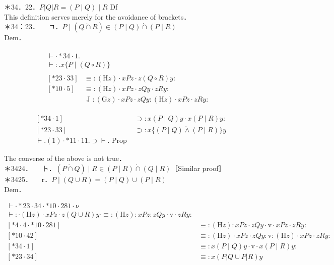 \documentclass[10pt]{article}
\begin{document}
＊34．22．$P|Q| R=(P \mid Q) \mid R$ Df\\
This definition serves merely for the avoidance of brackets．\\
＊34：23．$\quad$ ㄱ．$P \mid(Q \dot{\cap} R) \in(P \mid Q) \dot{\cap}(P \mid R)$\\
Dem．

$$
\begin{array}{ll}
\begin{array}{l}
\vdash \cdot * 34 \cdot 1 . \\
\vdash: . x\{P \mid(Q \circ R)\}
\end{array} & \\
\begin{array}{ll}
{[* 23 \cdot 33]} & \equiv:(\mathrm{H} z) \cdot x P z \cdot z(Q \circ R) y: \\
{[* 10 \cdot 5]} & \equiv:(\mathrm{H} z) \cdot x P z \cdot z Q y \cdot z R y: \\
& \text { J }:(\mathrm{G} z) \cdot x P z \cdot z Q y:(\mathrm{H} z) \cdot x P z \cdot z R y:
\end{array}
\end{array}
$$

\[
\begin{array}{ll}
{[* 34 \cdot 1]} & \supset: x(P \mid Q) y \cdot x(P \mid R) y: \\
{[* 23 \cdot 33]} & \supset: x\{(P \mid Q) \dot{\wedge}(P \mid R)\} y  \tag{1}\\
\vdash .(1) \cdot * 11 \cdot 11 . \supset \vdash . \text { Prop }
\end{array}
\]

The converse of the above is not true．\\
＊3424．$\quad$ ト．$(P \dot{\cap} Q) \mid R \in(P \mid R) \dot{\cap}(Q \mid R)$［Similar proof］\\
＊3425．$\quad$ r．$P \mid(Q \cup R)=(P \mid Q) \cup(P \mid R)$\\
Dem．

\[
\begin{array}{ll}
\vdash \cdot * 23 \cdot 34 \cdot * 10 \cdot 281 \cdot \nu & \\
\vdash: \cdot(\mathrm{H} z) \cdot x P z \cdot z(Q \cup R) y \cdot \equiv:(\mathrm{H} z): x P z: z Q y \cdot \mathrm{v} \cdot z R y: \\
{[* 4 \cdot 4 \cdot * 10 \cdot 281]} & \equiv:(\mathrm{H} z): x P z \cdot z Q y \cdot \mathrm{v} \cdot x P z \cdot z R y: \\
{[* 10 \cdot 42]} & \equiv:(\mathrm{H} z) \cdot x P z \cdot z Q y: \mathrm{v}:(\mathrm{H} z) \cdot x P z \cdot z R y: \\
{[* 34 \cdot 1]} & \equiv: x(P \mid Q) y \cdot \mathrm{v} \cdot x(P \mid R) y: \\
{[* 23 \cdot 34]} & \equiv: x(P|Q \cup P| R) y \tag{1}
\end{array}
\]
\end{document}
